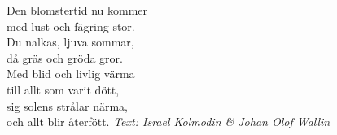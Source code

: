 \vspace{10pt}
Den blomstertid nu kommer\\
med lust och fägring stor.\\
Du nalkas, ljuva sommar,\\
då gräs och gröda gror.\\
Med blid och livlig värma\\
till allt som varit dött,\\
sig solens strålar närma,\\
och allt blir återfött.
\vspace{10pt}
{\footnotesize\textit{Text: Israel Kolmodin \& Johan Olof Wallin}}

